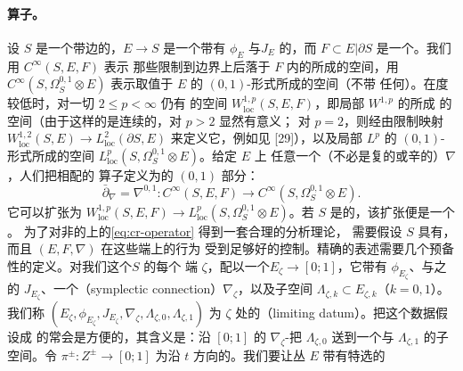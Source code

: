 \paragraph{\trCauchyRiemann{}算子。}\label{sub:cauchy-riemann-operators}
设 $S$ 是一个带边的\trRiemann\trSurface，$E\to S$ 是一个带有\trSymplecticStructure{}%
$\phi_E$ 与\trCompatible\trComplexStructure{}$J_E$ 的\trVectorBundle，而
$F\subset E|\partial S$ 是一个\trLagrange\trSubbundle。我们用 $C^\infty(S,E,F)$ 表示
那些限制到边界上后落于 $F$ 内的\trSection{}所成的空间，用
$C^\infty(S,\Omega^{0,1}_S\otimes E)$ 表示取值于 $E$ 的 $(0,1)$-形式所成的空间（不带
任何\trBoundaryCondition）。在\trSmooth{}度较低时，对一切 $2\le p<\infty$ 仍有%
\trWellDefined{}的空间 $W^{1,p}_{\mathrm{loc}}(S,E,F)$，即局部 $W^{1,p}$ 的\trSection{}所成
的空间（由于这样的\trSection{}是连续的，\trBoundaryCondition{}对 $p>2$ 显然有意义；
对 $p=2$，则经由限制映射 $W^{1,2}_{\mathrm{loc}}(S,E)\to
L^2_{\mathrm{loc}}(\partial S,E)$ 来定义它，例如见 [29]），以及局部 $L^p$ 的
$(0,1)$-形式所成的空间 $L^p_{\mathrm{loc}}(S,\Omega^{0,1}_S\otimes E)$。给定 $E$ 上
任意一个（不必是复的或辛的）\trConnection{}$\nabla$，人们把相配的%
\trCauchyRiemann{}算子定义为\trCovariantDifferentiation{}的 $(0,1)$ 部分：
\begin{equation}\label{eq:cr-operator}
\bar\partial_\nabla=\nabla^{0,1}\colon C^\infty(S,E,F)
\longrightarrow C^\infty(S,\Omega^{0,1}_S\otimes E).
\end{equation}
它可以扩张为 $W^{1,p}_{\mathrm{loc}}(S,E,F)\to
L^p_{\mathrm{loc}}(S,\Omega^{0,1}_S\otimes E)$。若 $S$ 是\trCompact{}的，该扩张便是一个%
\trFredholmOperator。
为了对非\trCompact{}的\trSurface{}上的\eqref{eq:cr-operator} 得到一套合理的分析理论，
需要假设 $S$ 具有\trStriplikeEnd，而且 $(E,F,\nabla)$ 在这些端上的\trAsymptotic{}行为
受到足够好的控制。精确的表述需要几个预备性的定义。对我们这个\trSurface{}$S$ 的每个
端 $\zeta$，配以一个\trVectorBundle{}$E_\zeta\to[0;1]$，它带有%
\trSymplecticStructure{}$\phi_{E_\zeta}$、与之\trCompatible{}的%
\trComplexStructure{}$J_{E_\zeta}$、一个\textbf{\trSymplectic\trConnection}（symplectic
connection）$\nabla_\zeta$，以及\trLagrange{}子空间
$\Lambda_{\zeta,k}\subset E_{\zeta,k}$（$k=0,1$）。我们称
$(E_\zeta,\phi_{E_\zeta},J_{E_\zeta},\nabla_\zeta,\Lambda_{\zeta,0},\Lambda_{\zeta,1})$
为 $\zeta$ 处的\textbf{\trLimitingDatum}（limiting datum）。把这个数据假设成%
\trNondegenerate{}的常会是方便的，其含义是：沿 $[0;1]$ 的
$\nabla_\zeta$-\trParallelTransport{}把 $\Lambda_{\zeta,0}$ 送到一个与
$\Lambda_{\zeta,1}$ \trTransverse{}的子空间。令 $\pi^\pm\colon Z^\pm\to[0;1]$ 为沿
$t$ 方向的\trProjection。我们要让丛 $E$ 带有特选的\trIsomorphism
